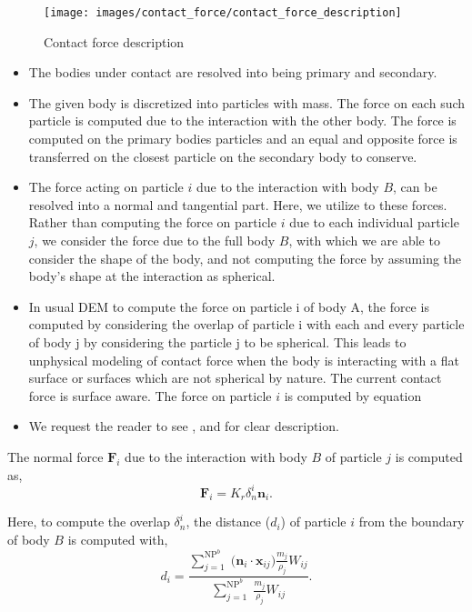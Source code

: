 \documentclass[preprint,12pt]{elsarticle}
\newcommand{\ten}[1]{\ensuremath{\mathbf{#1}}}
\begin{document}
\begin{figure}[!htpb]
  \centering
  \texttt{[image: images/contact\_force/contact\_force\_description]}
  \caption{Contact force description}
\label{fig:contact_foce_description}
\end{figure}

\begin{itemize}
\item The bodies under contact are resolved into being primary and secondary.
\item The given body is discretized into particles with mass. The force on
  each such particle is computed due to the interaction with the other body.
  The force is computed on the primary bodies particles and an equal and
  opposite force is transferred on the closest particle on the secondary body
  to conserve.
\item The force acting on particle $i$ due to the interaction with body $B$,
  can be resolved into a normal and tangential part. Here, we utilize
  \citet{mohseni2021particle} to these forces. Rather than computing the force
  on particle $i$ due to each individual particle $j$, we consider the force
  due to the full body $B$, with which we are able to consider the shape of
  the body, and not computing the force by assuming the body's shape at the
  interaction as spherical.
\item In usual DEM to compute the force on particle i of body A, the force is
  computed by considering the overlap of particle i with each and every
  particle of body j by considering the particle j to be spherical. This leads
  to unphysical modeling of contact force when the body is interacting with a
  flat surface or surfaces which are not spherical by nature. The current
  contact force is surface aware. The force on particle $i$ is computed by
  equation
\item We request the reader to see \citet{mohseni2021particle}, and
  \cite{csph} for clear description.
\end{itemize}


The normal force $\ten{F}_i$ due to the interaction with body $B$ of particle
$j$ is computed as,
\begin{equation}
  \label{eq:contact-algorithm-normal}
  \ten{F}_i = K_r \delta_{n}^{i} \ten{n}_i.
\end{equation}

Here, to compute the overlap $\delta_{n}^{i}$, the distance ($d_i$) of particle $i$
from the boundary of body $B$ is computed with,
\begin{equation}
  \label{eq:cf-distance-computation}
  d_i = \frac{
    \displaystyle\sum\limits_{j = 1}^{\text{NP}^{b}} \;
    \big( \ten{n}_i \cdot \ten{x}_{ij} \big)  \frac{m_j}{\rho_j} W_{ij}}
  {
    \displaystyle\sum\limits_{j = 1}^{\text{NP}^{b}} \;
    \frac{m_j}{\rho_j} W_{ij}}.
\end{equation}
\end{document}
